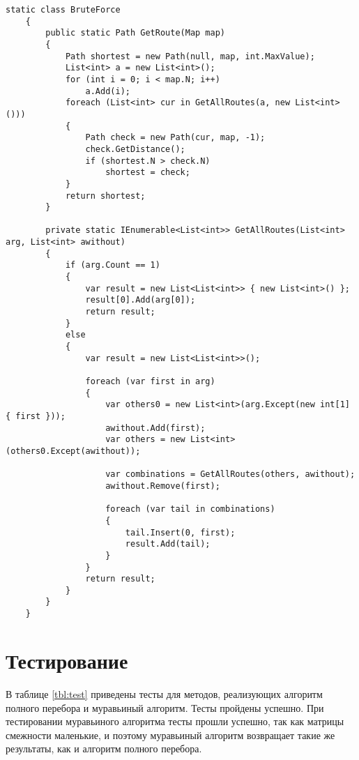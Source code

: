\begin{lstlisting}[label=lst:bf, caption=Реализация алгоритма полного перебора]
	static class BruteForce
	{
		public static Path GetRoute(Map map)
		{
			Path shortest = new Path(null, map, int.MaxValue);
			List<int> a = new List<int>();
			for (int i = 0; i < map.N; i++)
				a.Add(i);
			foreach (List<int> cur in GetAllRoutes(a, new List<int>()))
			{
				Path check = new Path(cur, map, -1);
				check.GetDistance();
				if (shortest.N > check.N)
					shortest = check;
			}
			return shortest;
		}
		
		private static IEnumerable<List<int>> GetAllRoutes(List<int> arg, List<int> awithout)
		{
			if (arg.Count == 1)
			{
				var result = new List<List<int>> { new List<int>() };
				result[0].Add(arg[0]);
				return result;
			}
			else
			{
				var result = new List<List<int>>();
				
				foreach (var first in arg)
				{
					var others0 = new List<int>(arg.Except(new int[1] { first }));
					awithout.Add(first);
					var others = new List<int>(others0.Except(awithout));
					
					var combinations = GetAllRoutes(others, awithout);
					awithout.Remove(first);
					
					foreach (var tail in combinations)
					{
						tail.Insert(0, first);
						result.Add(tail);
					}
				}
				return result;
			}
		}
	}
\end{lstlisting}

\section{Тестирование}

В таблице \ref{tbl:test} приведены тесты для методов, реализующих алгоритм полного перебора и муравьиный алгоритм. 
Тесты пройдены успешно.
При тестировании муравьиного алгоритма тесты прошли успешно, так как матрицы смежности маленькие, и поэтому муравьиный алгоритм возвращает такие же результаты, как и алгоритм полного перебора.

